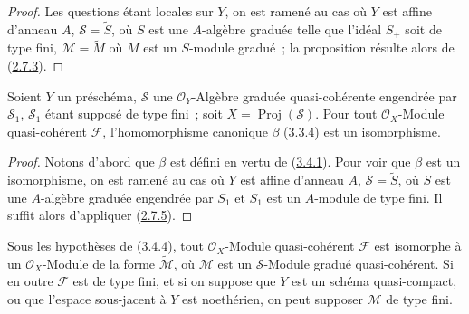 \begin{proof}
Les questions étant locales sur $Y$, on est ramené au cas où $Y$ est affine
d'anneau $A$, $\mathcal{S}=\widetilde{S}$, où $S$ est une $A$-algèbre graduée
telle que l'idéal $S_+$ soit de type fini,
$\mathcal{M}=\widetilde{M}$ où $M$ est un $S$-module gradué~; la proposition
résulte alors de (\hyperref[II.2.7.3-fr]{2.7.3}).
\end{proof}

\begin{theorem}[3.4.4]
\label{II.3.4.4-fr}
Soient $Y$ un préschéma, $\mathcal{S}$ une $\mathcal{O}_Y$-Algèbre graduée
quasi-cohérente engendrée par $\mathcal{S}_1$, $\mathcal{S}_1$ étant supposé
de type fini~; soit $X=\operatorname{Proj}(\mathcal{S})$. Pour tout
$\mathcal{O}_X$-Module quasi-cohérent $\mathcal{F}$, l'homomorphisme canonique
$\beta$ (\hyperref[II.3.3.4-fr]{3.3.4}) est un isomorphisme.
\end{theorem}

\begin{proof}
Notons d'abord que $\beta$ est défini en vertu de
(\hyperref[II.3.4.1-fr]{3.4.1}). Pour voir que $\beta$ est un isomorphisme,
on est ramené au cas où $Y$ est affine d'anneau $A$,
$\mathcal{S}=\widetilde{S}$, où $S$ est une $A$-algèbre graduée engendrée par
$S_1$ et $S_1$ est un $A$-module de type fini. Il suffit alors d'appliquer
(\hyperref[II.2.7.5-fr]{2.7.5}).
\end{proof}

\begin{corollary}[3.4.5]
\label{II.3.4.5-fr}
Sous les hypothèses de (\hyperref[II.3.4.4-fr]{3.4.4}), tout
$\mathcal{O}_X$-Module quasi-cohérent $\mathcal{F}$ est isomorphe à un
$\mathcal{O}_X$-Module de la forme $\widetilde{\mathcal{M}}$, où
$\mathcal{M}$ est un $\mathcal{S}$-Module gradué quasi-cohérent. Si en outre
$\mathcal{F}$ est de type fini, et si on suppose que $Y$ est un schéma
quasi-compact, ou que l'espace sous-jacent à $Y$ est noethérien, on peut
supposer $\mathcal{M}$ de type fini.
\end{corollary}


